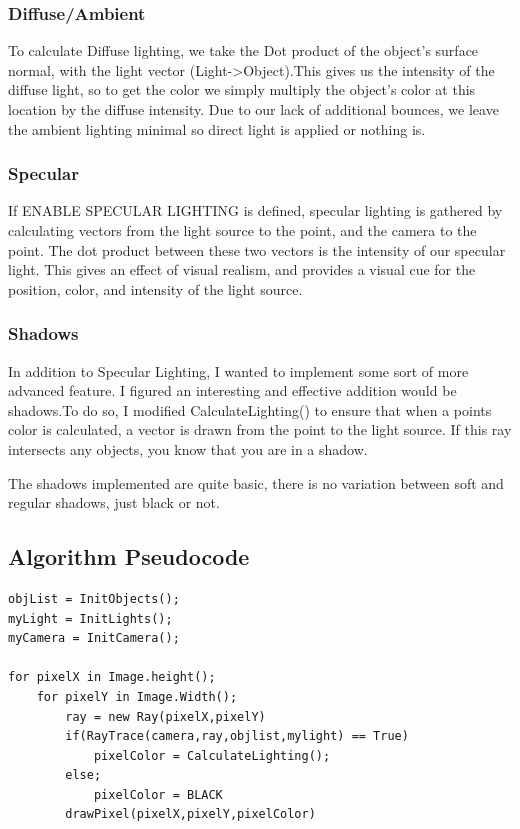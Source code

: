 \documentclass{article}
\begin{document}
\subsubsection{Diffuse/Ambient}
To calculate Diffuse lighting, we take the Dot product of the object's surface normal, with the light vector (Light->Object).This gives us the intensity of the diffuse light, so to get the color we simply multiply the object's color at this location by the diffuse intensity. Due to our lack of additional bounces, we leave the ambient lighting minimal so direct light is applied or nothing is. 
\subsubsection{Specular}

If ENABLE SPECULAR LIGHTING is defined, specular lighting is gathered by calculating vectors from the light source to the point, and the camera to the point. The dot product between these two vectors is the intensity of our specular light. This gives an effect of visual realism, and provides a visual cue for the position, color, and intensity of the light source.
\subsubsection{Shadows}
In addition to Specular Lighting, I wanted to implement some sort of more advanced feature. I figured an interesting and effective addition would be shadows.To do so, I modified CalculateLighting() to ensure that when a points color is calculated, a vector is drawn from the point to the light source. If this ray intersects any objects, you know that you are in a shadow. 

The shadows implemented are quite basic, there is no variation between soft and regular shadows, just black or not. 

\subsection{Algorithm Pseudocode}
\begin{verbatim}
objList = InitObjects();
myLight = InitLights();
myCamera = InitCamera();

for pixelX in Image.height();
	for pixelY in Image.Width();
    	ray = new Ray(pixelX,pixelY)
    	if(RayTrace(camera,ray,objlist,mylight) == True)
        	pixelColor = CalculateLighting();
        else;
        	pixelColor = BLACK
		drawPixel(pixelX,pixelY,pixelColor)
\end{verbatim}
\end{document}
